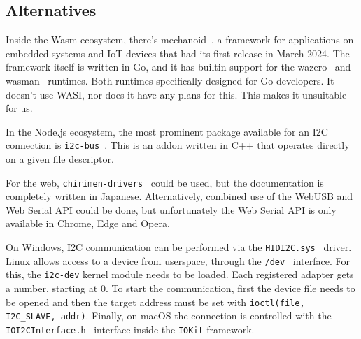 \newpage

\subsection{Alternatives}


Inside the \gls{Wasm} ecosystem, there's mechanoid~\cite{mechanoid}, a framework for applications on embedded systems and \gls{IoT} devices that had its first release in March 2024. The framework itself is written in Go, and it has builtin support for the wazero~\cite{wazero} and wasman~\cite{gh:wasman} runtimes. Both runtimes specifically designed for Go developers. It doesn't use \gls{WASI}, nor does it have any plans for this. This makes it unsuitable for us.

In the Node.js ecosystem, the most prominent package available for an \gls{I2C} connection is \texttt{i2c-bus}~\cite{gh:i2c-bus}. This is an addon written in C++ that operates directly on a given file descriptor.

For the web, \texttt{chirimen-drivers}~\cite{chirimen} could be used, but the documentation is completely written in Japanese. Alternatively, combined use of the WebUSB and Web Serial \gls{API} could be done, but unfortunately the Web Serial \gls{API} is only available in Chrome, Edge and Opera.

On Windows, \gls{I2C} communication can be performed via the \texttt{HIDI2C.sys}~\cite{windows:i2c} driver. Linux allows access to a device from userspace, through the \texttt{/dev}~\cite{linux:i2c} interface. For this, the \texttt{i2c-dev} kernel module needs to be loaded. Each registered adapter gets a number, starting at 0. To start the communication, first the device file needs to be opened and then the target address must be set with \texttt{ioctl(file, I2C\_SLAVE, addr)}. Finally, on macOS the connection is controlled with the \texttt{IOI2CInterface.h}~\cite{macos:i2c} interface inside the \texttt{IOKit} framework.

